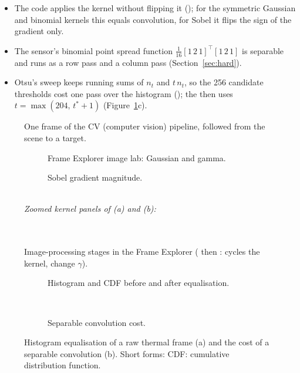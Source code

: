 \begin{itemize}
\item The code applies the kernel without flipping it (); for the symmetric Gaussian and
binomial kernels this equals convolution, for Sobel it flips the sign of the gradient only.
\item The sensor's binomial point spread function $\frac1{16}[1\,2\,1]^\top[1\,2\,1]$ is separable and runs as a row pass and
a column pass (Section~\ref{sec:hard}).
\item Otsu's sweep keeps running sums of $n_t$ and $t\,n_t$, so the 256 candidate thresholds cost one pass over the histogram
(); the  then uses $t=\max(204,\,t^\ast+1)$ (Figure~\ref{fig:cv}c).
\end{itemize}

\begin{figure}[htbp]
\centering
{}
\caption{One frame of the CV (computer vision) pipeline, followed from the scene to a target.}
\label{fig:cv}
\end{figure}

\begin{figure}[htbp]
\centering
\begin{subfigure}[t]{0.49\linewidth}\caption{Frame Explorer image lab: Gaussian and gamma.}\end{subfigure}\hfill
\begin{subfigure}[t]{0.49\linewidth}\caption{Sobel gradient magnitude.}\end{subfigure}\\[1mm]
{\footnotesize\textit{Zoomed kernel panels of (a) and (b):}}\\[0.5mm]
\feImagelabGaussGammaKernel\\[1mm]
\feImagelabSobelKernel\\[1mm]
\caption{Image-processing stages in the Frame Explorer ( then :  cycles the kernel, \key{[} \key{]} change $\gamma$).}
\label{fig:imglab-fe}
\end{figure}

\begin{figure}[htbp]
\centering
\begin{subfigure}[t]{\linewidth}\caption{Histogram and CDF before and after equalisation.}\end{subfigure}\\[1mm]
\begin{subfigure}[t]{0.5\linewidth}\centering{}\caption{Separable convolution cost.}\end{subfigure}
\caption{Histogram equalisation of a raw thermal frame (a) and the cost of a separable convolution (b). Short forms: CDF: cumulative distribution function.}
\label{fig:imglab}
\end{figure}

